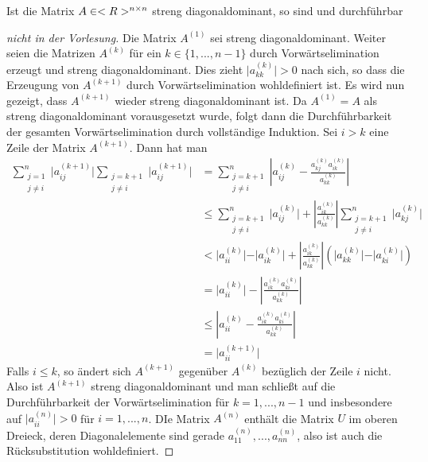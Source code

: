 \begin{lemma}
	Ist die Matrix $A\in<R>^{n\times n}$ streng diagonaldominant, so sind  und  durchführbar
\end{lemma}
\begin{proof}[nicht in der Vorlesung]
	Die Matrix $A^{(1)}$ sei streng diagonaldominant. Weiter seien die Matrizen $A^{(k)}$ für ein $k\in\{1,...,n-1\}$ durch Vorwärtselimination erzeugt und streng diagonaldominant. Dies zieht $\vert a_{kk}^{(k)}\vert >0$ nach sich, so dass die Erzeugung von $A^{(k+1)}$ durch Vorwärtselimination wohldefiniert ist. Es wird nun gezeigt, dass $A^{(k+1)}$ wieder streng diagonaldominant ist. Da $A^{(1)}=A$ als streng diagonaldominant vorausgesetzt wurde, folgt dann die Durchführbarkeit der gesamten Vorwärtselimination durch vollständige Induktion. Sei $i>k$ eine Zeile der Matrix $A^{(k+1)}$. Dann hat man
	\begin{align*}
		\sum_{\substack{j=1\\ j\neq i}}^n \vert a_{ij}^{(k+1)}\vert \sum_{\substack{j=k+1\\ j\neq i}}\vert a_{ij}^{(k+1)}\vert &= \sum_{\substack{j=k+1\\ j\neq i}}^n \left|a_{ij}^{(k)} - \frac{a_{kj}^{(k)} a_{ik}^{(k)}}{a_{kk}^{(k)}}\right| \\
		&\le \sum_{\substack{j=k+1\\ j\neq i}}^n \vert a_{ij}^{(k)}\vert + \left|\frac{a_{ik}^{(k)}}{a_{kk}^{(k)}}\right| \sum_{\substack{j=k+1\\ j\neq i}}^n \vert a_{kj}^{(k)}\vert \\
		&< \vert a_{ii}^{(k)}\vert - \vert a_{ik}^{(k)}\vert + \left|\frac{a_{ik}^{(k)}}{a_{kk}^{(k)}}\right| \left( \vert a_{kk}^{(k)}\vert - \vert a_{ki}^{(k)}\vert  \right) \\
		&= \vert a_{ii}^{(k)}\vert  - \left|\frac{a_{ik}^{(k)} a_{ki}^{(k)}}{a_{kk}^{(k)}}\right| \\
		&\le \left| a_{ii}^{(k)} - \frac{a_{ik}^{(k)} a_{ki}^{(k)}}{a_{kk}^{(k)}} \right| \\
		&= \vert a_{ii}^{(k+1)}\vert
	\end{align*}
	Falls $i\le k$, so ändert sich $A^{(k+1)}$ gegenüber $A^{(k)}$ bezüglich der Zeile $i$ nicht. Also ist $A^{(k+1)}$ streng diagonaldominant und man schließt auf die Durchführbarkeit der Vorwärtselimination für $k=1,...,n-1$ und insbesondere auf $\vert a_{ii}^{(n)}\vert >0$ für $i=1,...,n$. DIe Matrix $A^{(n)}$ enthält die Matrix $U$ im oberen Dreieck, deren Diagonalelemente sind gerade $a_{11}^{(n)},...,a_{nn}^{(n)}$, also ist auch die Rücksubstitution wohldefiniert.
\end{proof}

